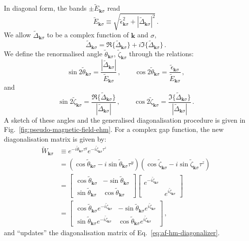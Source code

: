 In diagonal form, the bands $\pm \tilde{E}_{\mathbf{k}\sigma}$ read
\[
\tilde{E}_{\mathbf{k}\sigma} \equiv \sqrt{\tilde{\epsilon}_{\mathbf{k}\sigma}^2 + |\tilde{\Delta}_{\mathbf{k}\sigma}|^2} \, .
\]
We allow $\tilde{\Delta}_{\mathbf{k}\sigma}$ to be a complex function of $\mathbf{k}$ and $\sigma$,
\[
\tilde{\Delta}_{\mathbf{k}\sigma} = \Re \lbrace \tilde{\Delta}_{\mathbf{k}\sigma} \rbrace + i \Im \lbrace \tilde{\Delta}_{\mathbf{k}\sigma} \rbrace \, .
\]
We define the renormalised angle $\tilde{\theta}_{\mathbf{k}\sigma}$, $\tilde{\zeta}_{\mathbf{k}\sigma}$ through the relations:
\begin{equation}\label{eq:af-ehm-(~theta)}
	\sin 2\tilde{\theta}_{\mathbf{k}\sigma} = \frac{|\tilde{\Delta}_{\mathbf{k}\sigma}|}{\tilde{E}_{\mathbf{k}\sigma}} \, ,
	\qquad
	\cos 2\tilde{\theta}_{\mathbf{k}\sigma} = \frac{\tilde{\epsilon}_{\mathbf{k}\sigma}}{\tilde{E}_{\mathbf{k}\sigma}} \, ,
\end{equation}
and
\begin{equation}\label{eq:af-ehm-(~zeta)}
	\sin 2\tilde{\zeta}_{\mathbf{k}\sigma} = \frac{\Re\{\tilde{\Delta}_{\mathbf{k}\sigma}\}}{|\tilde{\Delta}_{\mathbf{k}\sigma}|} \, ,
	\qquad
	\cos 2\tilde{\zeta}_{\mathbf{k}\sigma} = \frac{\Im\{\tilde{\Delta}_{\mathbf{k}\sigma}\}}{|\tilde{\Delta}_{\mathbf{k}\sigma}|} \, .
\end{equation}
A sketch of these angles and the generalised diagonalisation procedure is given in Fig.~\ref{fig:pseudo-magnetic-field-ehm}. For a complex gap function, the new diagonalisation matrix is given by:
\[
\begin{aligned}
	\tilde{W}_{\mathbf{k}\sigma} &\equiv e^{-i \tilde{\theta}_{\mathbf{k}\sigma} \tau^y} e^{-i \tilde{\zeta}_{\mathbf{k}\sigma} \tau^z} \\
	&= \left(\cos \tilde{\theta}_{\mathbf{k}\sigma} -i \sin \tilde{\theta}_{\mathbf{k}\sigma} \tau^y \right) \left(\cos \tilde{\zeta}_{\mathbf{k}\sigma} -i \sin \tilde{\zeta}_{\mathbf{k}\sigma} \tau^z \right)\\
	&= \begin{bmatrix}
		\cos \tilde{\theta}_{\mathbf{k}\sigma} & - \sin \tilde{\theta}_{\mathbf{k}\sigma} \\
		\sin \tilde{\theta}_{\mathbf{k}\sigma} & \cos \tilde{\theta}_{\mathbf{k}\sigma}
	\end{bmatrix} \begin{bmatrix}
		e^{-i\tilde{\zeta}_{\mathbf{k}\sigma}} & \\ 
		& e^{i\tilde{\zeta}_{\mathbf{k}\sigma}}
	\end{bmatrix} \\
	&= \begin{bmatrix}
		\cos \tilde{\theta}_{\mathbf{k}\sigma} e^{-i\tilde{\zeta}_{\mathbf{k}\sigma}} & - \sin \tilde{\theta}_{\mathbf{k}\sigma} e^{i\tilde{\zeta}_{\mathbf{k}\sigma}} \\
		\sin \tilde{\theta}_{\mathbf{k}\sigma} e^{-i\tilde{\zeta}_{\mathbf{k}\sigma}} & \cos \tilde{\theta}_{\mathbf{k}\sigma} e^{i\tilde{\zeta}_{\mathbf{k}\sigma}}
	\end{bmatrix} \, ,
\end{aligned}
\]
and ``updates'' the diagonalisation matrix of Eq.~\eqref{eq:af-hm-diagonalizer}.

